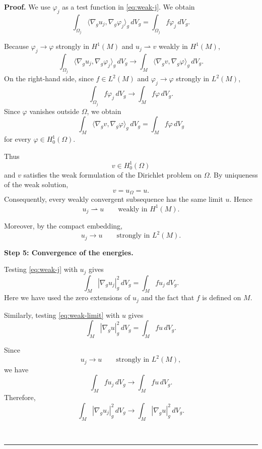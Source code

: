 \documentclass{article}
\newenvironment{proof}[1][Proof]{\textbf{#1.} }{\ \rule{0.5em}{0.5em}}
\begin{document}
\begin{proof}
We use $\varphi_j$ as a test function in \eqref{eq:weak-j}. We obtain
\begin{equation}
\int_{\Omega_j}
\langle\nabla_g u_j,\nabla_g\varphi_j\rangle_g\,dV_g
=
\int_{\Omega_j}f\varphi_j\,dV_g.
\label{eq:weak-test-transported}
\end{equation}

Because $\varphi_j\to\varphi$ strongly in $H^1(M)$ and
$u_j\rightharpoonup v$ weakly in $H^1(M)$,
\[
\int_{\Omega_j}
\langle\nabla_g u_j,\nabla_g\varphi_j\rangle_g\,dV_g
\longrightarrow
\int_M
\langle\nabla_g v,\nabla_g\varphi\rangle_g\,dV_g.
\]
On the right-hand side, since $f\in L^2(M)$ and
$\varphi_j\to\varphi$ strongly in $L^2(M)$,
\[
\int_{\Omega_j}f\varphi_j\,dV_g
\longrightarrow
\int_Mf\varphi\,dV_g.
\]
Since $\varphi$ vanishes outside $\Omega$, we obtain
\[
\int_M
\langle\nabla_g v,\nabla_g\varphi\rangle_g\,dV_g
=
\int_Mf\varphi\,dV_g
\]
for every $\varphi\in H_0^1(\Omega)$.

Thus
\[
v\in H_0^1(\Omega)
\]
and $v$ satisfies the weak formulation of the Dirichlet problem on
$\Omega$. By uniqueness of the weak solution,
\[
v=u_\Omega=u.
\]
Consequently, every weakly convergent subsequence has the same limit
$u$. Hence
\begin{equation}
u_j\rightharpoonup u
\qquad\text{weakly in }H^1(M).
\label{eq:weak-convergence-final}
\end{equation}

Moreover, by the compact embedding,
\begin{equation}
u_j\longrightarrow u
\qquad\text{strongly in }L^2(M).
\label{eq:L2-final}
\end{equation}

\medskip
\noindent
\textbf{Step 5: Convergence of the energies.}

Testing \eqref{eq:weak-j} with $u_j$ gives
\[
\int_M|\nabla_g u_j|_g^2\,dV_g
=
\int_Mfu_j\,dV_g.
\]
Here we have used the zero extensions of $u_j$ and the fact that
$f$ is defined on $M$.

Similarly, testing \eqref{eq:weak-limit} with $u$ gives
\[
\int_M|\nabla_g u|_g^2\,dV_g
=
\int_Mfu\,dV_g.
\]

Since
\[
u_j\longrightarrow u
\qquad\text{strongly in }L^2(M),
\]
we have
\[
\int_Mfu_j\,dV_g
\longrightarrow
\int_Mfu\,dV_g.
\]
Therefore,
\begin{equation}
\int_M|\nabla_g u_j|_g^2\,dV_g
\longrightarrow
\int_M|\nabla_g u|_g^2\,dV_g.
\label{eq:energy-convergence-final}
\end{equation}


\end{proof}
\end{document}
